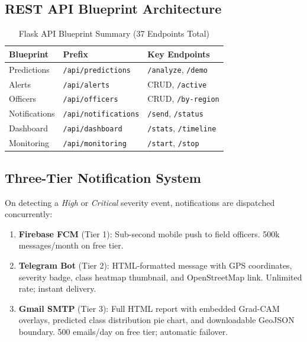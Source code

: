 \documentclass[10pt,conference]{IEEEtran}
\begin{document}
\subsection{REST API Blueprint Architecture}

\begin{table}[!t]
  \caption{Flask API Blueprint Summary (37 Endpoints Total)}
  \label{tab:api}
  \centering
  \small
  \begin{tabular}{l l p{2.6cm}}
    \toprule
    \textbf{Blueprint} & \textbf{Prefix} & \textbf{Key Endpoints} \\
    \midrule
    Predictions   & \texttt{/api/predictions}  & \texttt{/analyze}, \texttt{/demo} \\
    Alerts        & \texttt{/api/alerts}        & CRUD, \texttt{/active} \\
    Officers      & \texttt{/api/officers}      & CRUD, \texttt{/by-region} \\
    Notifications & \texttt{/api/notifications} & \texttt{/send}, \texttt{/status} \\
    Dashboard     & \texttt{/api/dashboard}     & \texttt{/stats}, \texttt{/timeline} \\
    Monitoring    & \texttt{/api/monitoring}    & \texttt{/start}, \texttt{/stop} \\
    \bottomrule
  \end{tabular}
\end{table}

\subsection{Three-Tier Notification System}

On detecting a \emph{High} or \emph{Critical} severity event, notifications
are dispatched concurrently:

\begin{enumerate}[leftmargin=*,topsep=2pt,itemsep=2pt]
  \item \textbf{Firebase FCM} (Tier 1): Sub-second mobile push to field
        officers. 500k messages/month on free tier.
  \item \textbf{Telegram Bot} (Tier 2): HTML-formatted message with GPS
        coordinates, severity badge, class heatmap thumbnail, and OpenStreetMap
        link. Unlimited rate; instant delivery.
  \item \textbf{Gmail SMTP} (Tier 3): Full HTML report with embedded Grad-CAM
        overlays, predicted class distribution pie chart, and downloadable
        GeoJSON boundary. 500 emails/day on free tier; automatic failover.
\end{enumerate}
\end{document}
